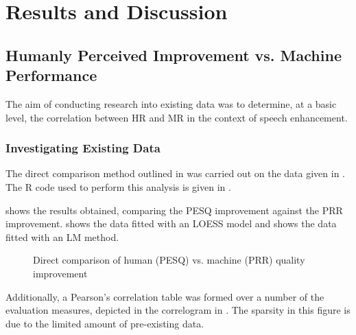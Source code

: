 
\chapter{Results and Discussion}

\acresetall


\section{Humanly Perceived Improvement vs. Machine Performance}

The aim of conducting research into existing data was to determine,
at a basic level, the correlation between \ac{HR} and \ac{MR} in
the context of speech enhancement.


\subsection{Investigating Existing Data}

The direct comparison method outlined in 
was carried out on the data given in  \textit{}.
The R code used to perform this analysis is given in .

 shows the results obtained, comparing the
\ac{PESQ} improvement against the \ac{PRR} improvement. 
shows the data fitted with an \ac{LOESS} model and 
shows the data fitted with an \ac{LM} method.

\begin{figure}[p]

\protect\caption{\label{fig:Direct-PESQ-PRR}Direct comparison of human (\acs{PESQ})
vs. machine (\acs{PRR}) quality improvement}
\end{figure}


Additionally, a Pearson's correlation table was formed over a number
of the evaluation measures, depicted in the correlogram in .
The sparsity in this figure is due to the limited amount of pre-existing
data.

